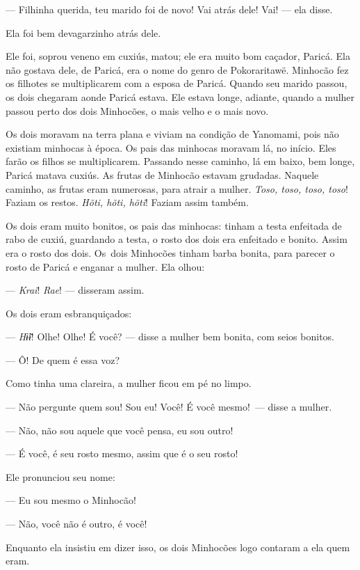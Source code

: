 --- Filhinha querida, teu marido foi de novo! Vai atrás dele! Vai! ---
ela disse. 

Ela foi bem devagarzinho atrás dele. 

Ele foi, soprou veneno em cuxiús, matou; ele era muito bom caçador,
 Paricá. Ela não gostava dele, de Paricá, era o nome do genro de
 Pokoraritawë. Minhocão fez os filhotes se multiplicarem com a esposa de
 Paricá. Quando seu marido passou, os dois chegaram aonde Paricá estava.
 Ele estava longe, adiante, quando a mulher passou perto dos dois
 Minhocões, o mais velho e o mais novo. 

Os dois moravam na terra plana e viviam na condição de Yanomami, pois
não existiam minhocas à época. Os pais das minhocas moravam lá, no
início. Eles farão os filhos se multiplicarem. Passando nesse caminho, lá
em baixo, bem longe, Paricá matava cuxiús. As frutas de Minhocão estavam
grudadas. Naquele caminho, as frutas eram numerosas, para atrair a
mulher. \textit{Toso, toso, toso, toso}! Faziam os restos. \textit{Hõti, hõti, hõti}!
Faziam assim também.

Os dois eram muito bonitos, os pais das minhocas: tinham a testa
enfeitada de rabo de cuxiú, guardando a testa, o rosto dos dois era
enfeitado e bonito. Assim era o rosto dos dois. Os~dois Minhocões tinham
barba bonita, para parecer o rosto de Paricá e enganar a mulher. Ela
olhou:

--- \textit{Krai}! \textit{Rae}! --- disseram assim. 

Os dois eram esbranquiçados: 

--- \textit{Hɨ̃ɨ}! Olhe! Olhe! É você? --- disse a mulher bem bonita, com seios
bonitos.

--- Ô! De quem é essa voz?

Como tinha uma clareira, a mulher ficou em pé no limpo. 

--- Não pergunte quem sou! Sou eu! Você! É você mesmo!~--- disse a
mulher.

--- Não, não sou aquele que você pensa, eu sou outro! 

--- É você, é seu rosto mesmo, assim que é o seu rosto! 

Ele pronunciou seu nome: 

--- Eu sou mesmo o Minhocão!

--- Não, você não é outro, é você! 

Enquanto ela insistiu em dizer isso, os dois Minhocões logo contaram a ela quem eram. 

